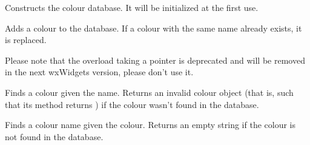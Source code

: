 



\label{wxcolourdatabaseconstr}


Constructs the colour database. It will be initialized at the first use.


\label{wxcolourdatabaseaddcolour}



Adds a colour to the database. If a colour with the same name already exists,
it is replaced.

Please note that the overload taking a pointer is deprecated and will be
removed in the next wxWidgets version, please don't use it.


\label{wxcolourdatabasefind}


Finds a colour given the name. Returns an invalid colour object (that is, such
that its  method returns \false) if the colour wasn't
found in the database.


\label{wxcolourdatabasefindname}


Finds a colour name given the colour. Returns an empty string if the colour is
not found in the database.
